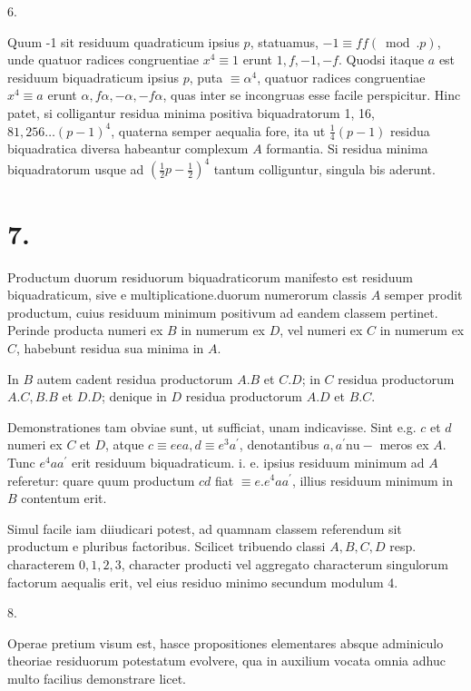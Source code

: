 \documentclass[10pt]{article}
\begin{document}
6.

Quum -1 sit residuum quadraticum ipsius \(p\), statuamus, \(-1 \equiv f f(\bmod . p)\), unde quatuor radices congruentiae \(x^{4} \equiv 1\) erunt \(1, f,-1,-f\). Quodsi itaque
\(a\) est residuum biquadraticum ipsius \(p\), puta \(\equiv \alpha^{4}\), quatuor radices congruentiae \(x^{4} \equiv a\) erunt \(\alpha, f \alpha,-\alpha,-f \alpha\), quas inter se incongruas esse facile perspicitur. Hinc patet, si colligantur residua minima positiva biquadratorum 1, 16, \(81,256 \ldots(p-1)^{4}\), quaterna semper aequalia fore, ita ut \(\frac{1}{4}(p-1)\) residua biquadratica diversa habeantur complexum \(A\) formantia. Si residua minima biquadratorum usque ad \(\left(\frac{1}{2} p-\frac{1}{2}\right)^{4}\) tantum colliguntur, singula bis aderunt.

\section*{7.}
Productum duorum residuorum biquadraticorum manifesto est residuum biquadraticum, sive e multiplicatione.duorum numerorum classis \(A\) semper prodit productum, cuius residuum minimum positivum ad eandem classem pertinet. Perinde producta numeri ex \(B\) in numerum ex \(D\), vel numeri ex \(C\) in numerum ex \(C\), habebunt residua sua minima in \(A\).

In \(B\) autem cadent residua productorum \(A . B\) et \(C . D\); in \(C\) residua productorum \(A . C, B . B\) et \(D . D\); denique in \(D\) residua productorum \(A . D\) et \(B . C\).

Demonstrationes tam obviae sunt, ut sufficiat, unam indicavisse. Sint e.g. \(c\) et \(d\) numeri ex \(C\) et \(D\), atque \(c \equiv e e a, d \equiv e^{3} a^{\prime}\), denotantibus \(a, a^{\prime} \mathrm{nu}-\) meros ex \(A\). Tunc \(e^{4} a a^{\prime}\) erit residuum biquadraticum. i. e. ipsius residuum minimum ad \(A\) referetur: quare quum productum \(c d\) fiat \(\equiv e . e^{4} a a^{\prime}\), illius residuum minimum in \(B\) contentum erit.

Simul facile iam diiudicari potest, ad quamnam classem referendum sit productum e pluribus factoribus. Scilicet tribuendo classi \(A, B, C, D\) resp. characterem \(0,1,2,3\), character producti vel aggregato characterum singulorum factorum aequalis erit, vel eius residuo minimo secundum modulum 4.

8.

Operae pretium visum est, hasce propositiones elementares absque adminiculo theoriae residuorum potestatum evolvere, qua in auxilium vocata omnia adhuc multo facilius demonstrare licet.
\end{document}
